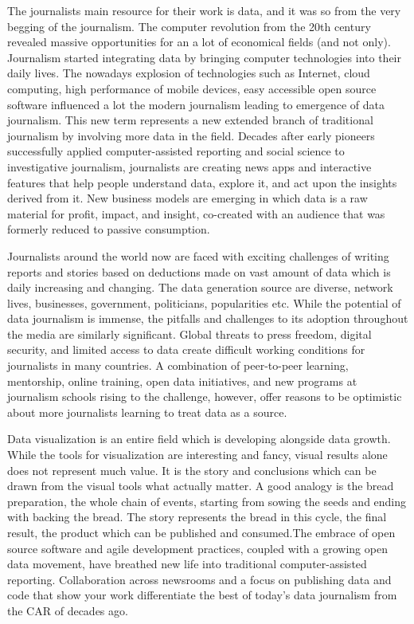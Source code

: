 The journalists main resource for their work is data, and it was so from the very begging of the journalism. The computer revolution from the 20th century revealed massive opportunities for an a lot of economical fields (and not only). Journalism started integrating data by bringing computer technologies into their daily lives. The nowadays explosion of technologies such as Internet, cloud computing, high performance of mobile devices, easy accessible open source software influenced a lot the modern journalism leading to emergence of data journalism. This new term represents a new extended branch of traditional journalism by involving more data in the field. Decades after early pioneers successfully applied computer-assisted reporting and social science to investigative journalism, journalists are creating news apps and interactive features that help people understand data, explore it, and act upon the insights derived from it. New business models are emerging in which data is a raw material for profit, impact, and insight, co-created with an audience that was formerly reduced to passive consumption.

Journalists around the world now are faced with exciting challenges of writing reports and stories based on deductions made on vast amount of data which is daily increasing and changing. The data generation source are diverse, network lives, businesses, government, politicians, popularities etc. While the potential of data journalism is immense, the pitfalls and challenges to its adoption throughout the media are similarly significant. Global threats to press freedom, digital security, and limited access to data create difficult working conditions for journalists in many countries. A combination of peer-to-peer learning, mentorship, online training, open data initiatives, and new programs at journalism schools rising to the challenge, however, offer reasons to be optimistic about more journalists learning to treat data as a source.

Data visualization is an entire field which is developing alongside data growth. While the tools for visualization are interesting and fancy, visual results alone does not represent much value. It is the story and conclusions which can be drawn from the visual tools what actually matter. A good analogy is the bread preparation, the whole chain of events, starting from sowing the seeds and ending with backing the bread. The story represents the bread in this cycle, the final result, the product which can be published and consumed.The embrace of open source software and agile development practices, coupled with a growing open data movement, have breathed new life into traditional computer-assisted reporting. Collaboration across newsrooms and a focus on publishing data and code that show your work differentiate the best of today’s data journalism from the CAR of decades ago.

